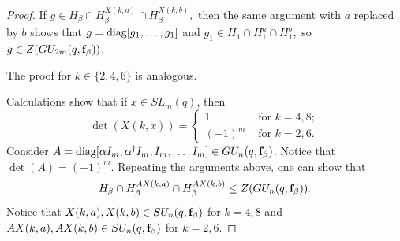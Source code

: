 \begin{proof}
 If $g \in H_{\beta} \cap H_{\beta}^{X(k,a)} \cap H_{\beta}^{X(k,b)},$ then the same argument   with $a$ replaced by $b$ shows that 
$g=\mathrm{diag}[g_1, \ldots, g_1]$ and $g_1 \in H_{1} \cap H_{1}^{a} \cap H_{1}^{b},$ so $g \in Z(GU_{2m}(q, {\bf f}_{\beta}))$.

The proof for $k \in \{2,4,6\}$ is analogous.

Calculations show that if $x \in SL_m(q)$, then 
$$\det(X(k,x))=\begin{cases}
1 & \text{ for } k=4,8;\\
(-1)^m & \text{ for } k=2,6.
\end{cases}
$$ 
Consider $A=\mathrm{diag}[\alpha I_m, \alpha^{\dagger} I_m, I_m, \ldots, I_m] \in GU_n(q, {\bf f}_{\beta})$. Notice that $\det(A)=(-1)^m.$ Repeating the arguments above, one can show that  $$H_{\beta} \cap H_{\beta}^{AX(k,a)} \cap H_{\beta}^{AX(k,b)} \le Z(GU_n(q, {\bf f}_{\beta})).$$  Notice that $X(k,a), X(k,b) \in SU_n(q, {\bf f}_{\beta})$ for $k=4,8$ and $AX(k,a), AX(k,b) \in SU_n(q, {\bf f}_{\beta})$ for $k=2,6.$ 
\end{proof}

